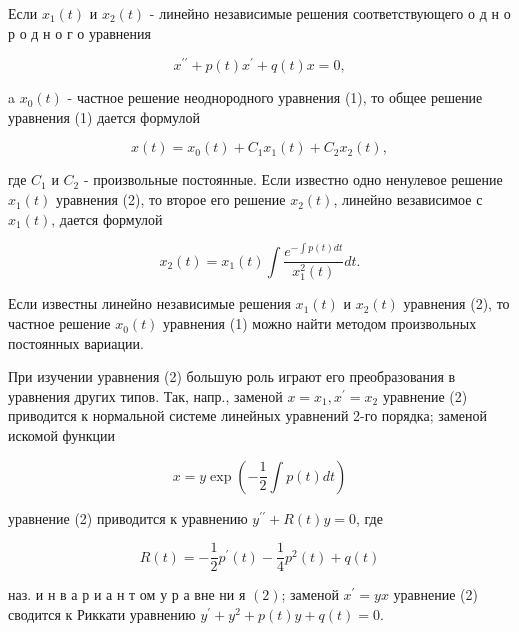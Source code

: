 \documentclass[10pt]{article}
\begin{document}
Если $x_{1}(t)$ и $x_{2}(t)$ - линейно независимые решения соответствующего о д н о р о д н о г о уравнения



\[

x^{\prime \prime}+p(t) x^{\prime}+q(t) x=0,

\]



a $x_{0}(t)$ - частное решение неоднородного уравнения (1), то общее решение уравнения (1) дается формулой



\[

x(t)=x_{0}(t)+C_{1} x_{1}(t)+C_{2} x_{2}(t),

\]



где $C_{1}$ и $C_{2}$ - произвольные постоянные. Если известно одно ненулевое решение $x_{1}(t)$ уравнения (2), то второе его решение $x_{2}(t)$, линейно везависимое с $x_{1}(t)$, дается формулой



\[

x_{2}(t)=x_{1}(t) \int \frac{e^{-\int p(t) d t}}{x_{1}^{2}(t)} d t .

\]



Если известны линейно независимые решения $x_{1}(t)$ и $x_{2}(t)$ уравнения (2), то частное решение $x_{0}(t)$ уравнения (1) можно найти методом произвольных постоянных вариации.



При изучении уравнения (2) большую роль играют его преобразования в уравнения других типов. Так, напр., заменой $x=x_{1}, x^{\prime}=x_{2}$ уравнение (2) приводится к нормальной системе линейных уравнений 2-го порядка; заменой искомой функции



\[

x=y \exp \left(-\frac{1}{2} \int p(t) d t\right)

\]



уравнение (2) приводится к уравнению $y^{\prime \prime}+R(t) y=0$, где



\[

R(t)=-\frac{1}{2} p^{\prime}(t)-\frac{1}{4} p^{2}(t)+q(t)

\]



наз. и н в а р и а н т ом у р а вне ни я $(2)$; заменой $x^{\prime}=y x$ уравнение (2) сводится к Риккати уравнению $y^{\prime}+y^{2}+p(t) y+q(t)=0$.
\end{document}
